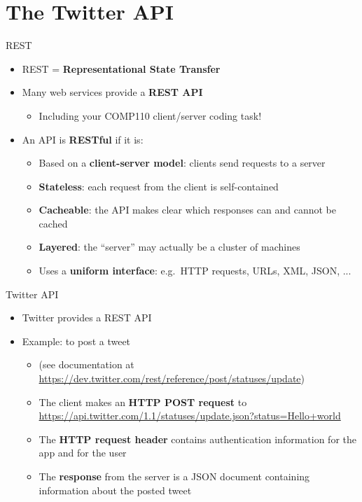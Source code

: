 \part{The Twitter API}
\frame{\partpage}

\begin{frame}{REST}
    \begin{itemize}
        \item REST = \textbf{Representational State Transfer} \pause
        \item Many web services provide a \textbf{REST API} \pause
            \begin{itemize}
                \item Including your COMP110 client/server coding task! \pause
            \end{itemize}
        \item An API is \textbf{RESTful} if it is: \pause
            \begin{itemize}
                \item Based on a \textbf{client-server model}: clients send requests to a server \pause
                \item \textbf{Stateless}: each request from the client is self-contained \pause
                \item \textbf{Cacheable}: the API makes clear which responses can and cannot be cached \pause
                \item \textbf{Layered}: the ``server'' may actually be a cluster of machines \pause
                \item Uses a \textbf{uniform interface}: e.g.\ HTTP requests, URLs, XML, JSON, ...
            \end{itemize}
    \end{itemize}
\end{frame}

\begin{frame}{Twitter API}
    \begin{itemize}
        \item Twitter provides a REST API \pause
        \item Example: to post a tweet \pause
            \begin{itemize}
                \item (see documentation at \url{https://dev.twitter.com/rest/reference/post/statuses/update}) \pause
                \item The client makes an \textbf{HTTP POST request} to
                    \url{https://api.twitter.com/1.1/statuses/update.json?status=Hello+world} \pause
                \item The \textbf{HTTP request header} contains authentication information for the app
                    and for the user \pause
                \item The \textbf{response} from the server is a JSON document containing information about the
                    posted tweet
            \end{itemize}
    \end{itemize}
\end{frame}

